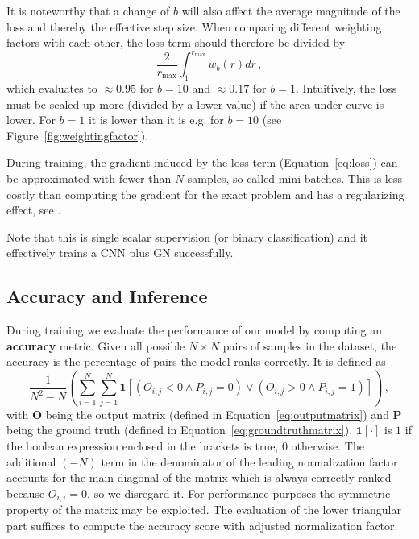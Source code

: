 It is noteworthy that a change of $b$ will also affect the average magnitude of the loss and thereby the effective step size. When comparing different weighting factors with each other, the loss term should therefore be divided by
\begin{equation}\label{eq:losswnormalization}
\frac{2}{r_\text{max}}\int_1^{r_\text{max}}w_b(r)dr\,,
\end{equation}
which evaluates to $\approx0.95$ for $b=10$ and $\approx0.17$ for $b=1$. Intuitively, the loss must be scaled up more (divided by a lower value) if the area under curve is lower. For $b=1$ it is lower than it is e.g. for $b=10$ (see Figure~\ref{fig:weightingfactor}).

During training, the gradient induced by the loss term (Equation~\ref{eq:loss}) can be approximated with fewer than $N$ samples, so called mini-batches. This is less costly than computing the gradient for the exact problem and has a regularizing effect, see \cite{DBLP:journals/corr/KeskarMNST16}.

Note that this is single scalar supervision (or binary classification) and it effectively trains a CNN plus GN successfully.

\subsection{Accuracy and Inference}
\label{sec:accuracy}

During training we evaluate the performance of our model by computing an \textbf{accuracy} metric. Given all possible $N\times N$ pairs of samples in the dataset, the accuracy is the percentage of pairs the model ranks correctly. It is defined as \begin{equation}\label{eq:acc}
    \frac{1}{N^2-N}\left(\sum_{i=1}^N\sum_{j=1}^N\bm{1}\left[\left(O_{i,j}<0\land P_{i,j}=0\right)\lor\left(O_{i,j}>0\land P_{i,j}=1\right)\right]\right)\,,
\end{equation}with $\bm{O}$ being the output matrix (defined in Equation~\ref{eq:outputmatrix}) and $\bm{P}$ being the ground truth (defined in Equation~\ref{eq:groundtruthmatrix}). $\bm{1}\left[\cdot\right]$ is $1$ if the boolean expression enclosed in the brackets is true, $0$ otherwise. The additional $(-N)$ term in the denominator of the leading normalization factor accounts for the main diagonal of the matrix which is always correctly ranked because $O_{i,i}=0$, so we disregard it. For performance purposes the symmetric property of the matrix may be exploited. The evaluation of the lower triangular part suffices to compute the accuracy score with adjusted normalization factor.

